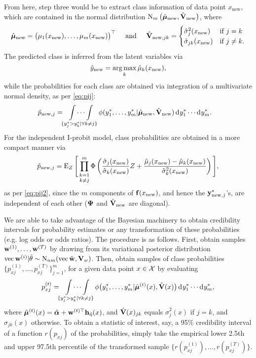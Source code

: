 From here, step three would be to extract class information of data point $x_\text{new}$, which are contained in the normal distribution $\operatorname{N}_{m}\big(\hat{{\bm\mu}}_{\text{new}}, \hat{{\mathbf V}}_{\text{new}} \big)$, where
\begin{equation*}
  \hat{{\bm\mu}}_{\text{new}} = \big(\mu_1(x_\text{new}),\dots, \mu_m(x_\text{new}) \big)^\top 
  \hspace{0.5cm}\text{and}\hspace{0.5cm}
  \hat{{\mathbf V}}_{{\text{new}},jk} = 
  \begin{cases}
    \hat\sigma_j^2(x_\text{new}) & \text{if } j = k \\
    \hat\sigma_{jk}(x_\text{new}) & \text{if } j \neq k. \\
  \end{cases}
\end{equation*}
The predicted class is inferred from the latent variables via
\[
  \hat y_{\text{new}} = \operatorname*{arg\,max}_k \hat\mu_k(x_{\text{new}}), 
\]
while the probabilities for each class are obtained via integration of a multivariate normal density, as per \cref{eq:pij}:
\begin{align}
  \hat p_{\text{new},j} 
  &=  \idotsint\displaylimits_{\{y^*_j > y^*_k | \forall k \neq j \}} \phi(y_{1}^*, \dots, y_{m}^*|\hat{{\bm\mu}}_{\text{new}}, \hat{{\mathbf V}}_{{\text{new}}}) \operatorname{d}\hspace{0.5pt}\! y_{1}^* \cdots \operatorname{d}\hspace{0.5pt}\! y_{m}^*.
\end{align}
For the independent I-probit model, class probabilities are obtained in a more compact manner via
\[
  \hat p_{\text{new},j} 
  = \operatorname{E}_Z \Bigg[ \mathop{\prod_{k=1}^m}_{k\neq j} 
  \Phi \left(\frac{\hat\sigma_j(x_\text{new})}{\hat\sigma_k(x_\text{new})} Z + \frac{\hat\mu_j(x_{\text{new}}) - \hat\mu_k(x_{\text{new}})}{\hat\sigma_k^2(x_\text{new})} \right) \Bigg],
\]
as per \cref{eq:pij2}, since the $m$ components of ${\mathbf f}(x_{\text{new}})$, and hence the ${\mathbf y}^*_{{\text{new}},j}$'s, are independent of each other (${\bm\Psi}$ and $\hat{{\mathbf V}}_{\text{new}}$ are diagonal).

We are able to take advantage of the Bayesian machinery to obtain credibility intervals for probability estimates or any transformation of these probabilities (e.g. log odds or odds ratios).
The procedure is as follows.
First, obtain samples ${\mathbf w}^{(1)},\dots,{\mathbf w}^{(T)}$ by drawing from its variational posterior distribution $\operatorname{vec}{\mathbf w}^{(i)}|\hat\theta \sim \operatorname{N}_{nm}(\operatorname{vec} \tilde{{\mathbf w}},{\mathbf V}_w)$.
Then, obtain samples of class probabilities $\{p_{xj}^{(1)},\dots, p_{xj}^{(T)} \}_{j=1}^m$, for a given data point $x\in{\mathcal X}$ by evaluating
\[
  p_{xj}^{(t)} = \idotsint\displaylimits_{\{y^*_j > y^*_k | \forall k \neq j \}} \phi\big(y_{1}^*, \dots, y_{m}^*|\hat{{\bm\mu}}^{(t)}(x), \hat{{\mathbf V}}(x)\big) \operatorname{d}\hspace{0.5pt}\! y_{1}^* \cdots \operatorname{d}\hspace{0.5pt}\! y_{m}^*,
\]
where $\hat{{\bm\mu}}^{(t)}(x) = \hat{{\bm\alpha}} + {\mathbf w}^{(t)\top}{\mathbf h}_{\hat\eta}(x)$, and $\hat{{\mathbf V}}(x)_{jk}$ equals $\hat\sigma^2_j(x)$ if $j = k$, and $\hat\sigma_{jk}(x)$ otherwise.
To obtain a statistic of interest, say, a 95\% credibility interval of a function $r(p_{xj})$ of the probabilities, simply take the empirical lower 2.5th and upper 97.5th percentile of the transformed sample $\big\{ r(p_{xj}^{(1)}),\dots, r(p_{xj}^{(T)}) \big\}$.

